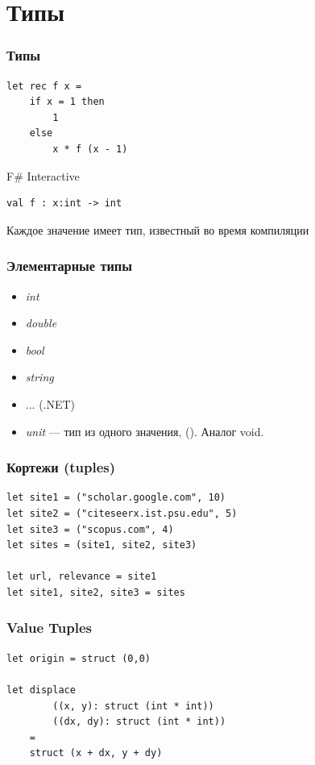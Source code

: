 \documentclass[xetex,mathserif,serif]{beamer}
\begin{document}
	\section{Типы}
			
	\begin{frame}[fragile]
		\frametitle{Типы}
		\begin{verbatim}
let rec f x =
    if x = 1 then 
        1 
    else 
        x * f (x - 1)
		\end{verbatim}

		\begin{alertblock}{F\# Interactive}
			\begin{verbatim}
val f : x:int -> int
			\end{verbatim}
		\end{alertblock}
		Каждое значение имеет тип, известный во время компиляции
\end{frame}

	\begin{frame}
		\frametitle{Элементарные типы}
		\begin{itemize}
			\item \textit{int}
			\item \textit{double}
			\item \textit{bool}
			\item \textit{string}
			\item ... (.NET)
			\item \textit{unit} --- тип из одного значения, (). Аналог void.
		\end{itemize}
	\end{frame}
	
	\begin{frame}[fragile]
		\frametitle{Кортежи (tuples)}
		\begin{verbatim}
let site1 = ("scholar.google.com", 10)
let site2 = ("citeseerx.ist.psu.edu", 5)
let site3 = ("scopus.com", 4)
let sites = (site1, site2, site3)

let url, relevance = site1
let site1, site2, site3 = sites
		\end{verbatim}
	\end{frame}

	\begin{frame}[fragile]
		\frametitle{Value Tuples}
		\begin{verbatim}
let origin = struct (0,0)

let displace 
        ((x, y): struct (int * int))
        ((dx, dy): struct (int * int)) 
    =
    struct (x + dx, y + dy)
		\end{verbatim}
	\end{frame}
\end{document}
